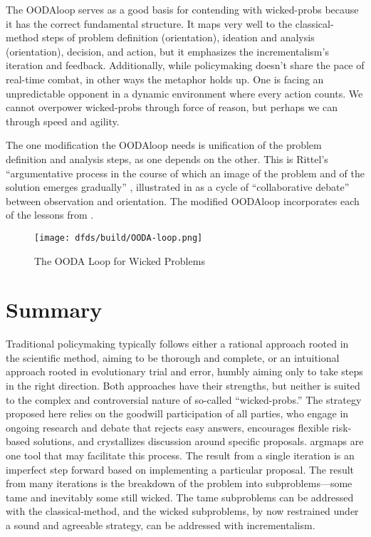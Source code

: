 The \ac{OODAloop} serves as a good basis for contending with \acp{wicked-prob} because it has the correct fundamental
structure. It maps very well to the \ac{classical-method} steps of problem definition (orientation), ideation and
analysis (orientation), decision, and action, but it emphasizes the \ac{incrementalism}'s iteration and feedback.
Additionally, while policymaking doesn't share the pace of real-time combat, in other ways the metaphor holds up. One is
facing an unpredictable opponent in a dynamic environment where every action counts. We cannot overpower
\acp{wicked-prob} through force of reason, but perhaps we can through speed and agility.

The one modification the \ac{OODAloop} needs is unification of the problem definition and analysis steps, as one depends
on the other. This is Rittel's ``argumentative process in the course of which an image of the problem and of the
solution emerges gradually'' \cite{rittel_dilemmas_1973}, illustrated in  as a cycle of
``collaborative debate'' between observation and orientation. The modified \ac{OODAloop} incorporates each of the
lessons from .

\begin{figure}[h]
    \centering\CaptionFontSize
    \texttt{[image: dfds/build/OODA-loop.png]}
    \caption{The OODA Loop for Wicked Problems}
    \label{fig-policy-ooda-loop}
\end{figure}


\section{Summary}

Traditional policymaking typically follows either a rational approach rooted in the scientific method, aiming to be
thorough and complete, or an intuitional approach rooted in evolutionary trial and error, humbly aiming only to take
steps in the right direction. Both approaches have their strengths, but neither is suited to the complex and
controversial nature of so-called ``\acp{wicked-prob}.'' The strategy proposed here relies on the goodwill participation
of all parties, who engage in ongoing research and debate that rejects easy answers, encourages flexible risk-based
solutions, and crystallizes discussion around specific proposals. \Acp{argmap} are one tool that may facilitate this
process. The result from a single iteration is an imperfect step forward based on implementing a particular proposal.
The result from many iterations is the breakdown of the problem into subproblems---some tame and inevitably some still
wicked. The tame subproblems can be addressed with the \ac{classical-method}, and the wicked subproblems, by now
restrained under a sound and agreeable strategy, can be addressed with \ac{incrementalism}.

